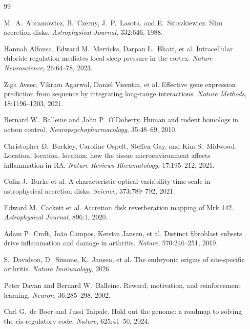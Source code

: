 \documentclass[12pt, a4paper]{article}
\theoremstyle{definition}
\begin{document}
\newpage
\begin{thebibliography}{99}

M.\ A.\ Abramowicz, B.\ Czerny, J.\ P.\ Lasota, and E.\ Szuszkiewicz.
\newblock Slim accretion disks.
\newblock \textit{Astrophysical Journal}, 332:646, 1988.

Hannah Alfonsa, Edward M.\ Merricks, Darpan L.\ Bhatt, et al.
\newblock Intracellular chloride regulation mediates local sleep pressure in the cortex.
\newblock \textit{Nature Neuroscience}, 26:64--78, 2023.

Ziga Avsec, Vikram Agarwal, Daniel Visentin, et al.
\newblock Effective gene expression prediction from sequence by integrating long-range interactions.
\newblock \textit{Nature Methods}, 18:1196--1203, 2021.

Bernard W.\ Balleine and John P.\ O'Doherty.
\newblock Human and rodent homologs in action control.
\newblock \textit{Neuropsychopharmacology}, 35:48--69, 2010.

Christopher D.\ Buckley, Caroline Ospelt, Steffen Gay, and Kim S.\ Midwood.
\newblock Location, location, location: how the tissue microenvironment affects inflammation in RA.
\newblock \textit{Nature Reviews Rheumatology}, 17:195--212, 2021.

Colin J.\ Burke et al.
\newblock A characteristic optical variability time scale in astrophysical accretion disks.
\newblock \textit{Science}, 373:789--792, 2021.

Edward M.\ Cackett et al.
\newblock Accretion disk reverberation mapping of Mrk 142.
\newblock \textit{Astrophysical Journal}, 896:1, 2020.

Adam P.\ Croft, Jo\~{a}o Campos, Kerstin Jansen, et al.
\newblock Distinct fibroblast subsets drive inflammation and damage in arthritis.
\newblock \textit{Nature}, 570:246--251, 2019.

S.\ Davidson, D.\ Simone, K.\ Jansen, et al.
\newblock The embryonic origins of site-specific arthritis.
\newblock \textit{Nature Immunology}, 2026.

Peter Dayan and Bernard W.\ Balleine.
\newblock Reward, motivation, and reinforcement learning.
\newblock \textit{Neuron}, 36:285--298, 2002.

Carl G.\ de Boer and Jussi Taipale.
\newblock Hold out the genome: a roadmap to solving the cis-regulatory code.
\newblock \textit{Nature}, 625:41--50, 2024.


\end{thebibliography}
\end{document}
